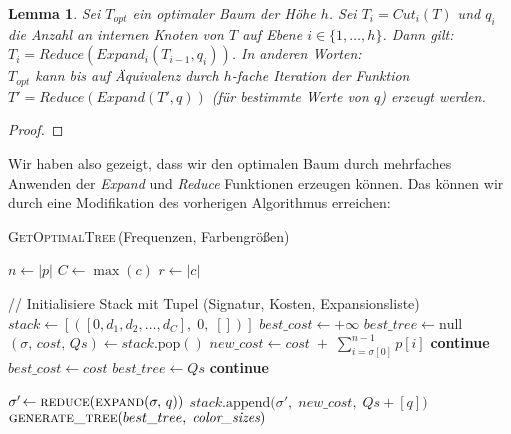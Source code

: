 \documentclass[a4paper,10pt,ngerman]{scrartcl}
\newtheorem{lemma}[satz]{Lemma}
\begin{document}
    \begin{lemma}
        Sei $T_{opt}$ ein optimaler Baum der Höhe $h$.
        Sei $T_i = Cut_i(T)$ und $q_i$ die Anzahl an internen Knoten von $T$ auf Ebene $i \in \{1, \dots, h\}$.
        Dann gilt: $T_i = Reduce(Expand_i(T_{i-1}, q_i))$.
        In anderen Worten: \\
        $T_{opt}$ kann bis auf Äquivalenz durch $h$-fache Iteration der Funktion $T' = Reduce(Expand(T',q))$ (für bestimmte Werte von $q$) erzeugt werden.
    \end{lemma}
    \begin{proof}

    \end{proof}
    Wir haben also gezeigt, dass wir den optimalen Baum durch mehrfaches Anwenden der \textit{Expand} und \textit{Reduce} Funktionen erzeugen können.
    Das können wir durch eine Modifikation des vorherigen Algorithmus erreichen:
    \begin{algorithm} [H]
        \caption{\textsc{GetOptimalTree}\,(Frequenzen, Farbengrößen)}
        \begin{algorithmic}[1]
                \State $n \gets |p|$  
                \State $C \gets \max(c)$ 
                \State $r \gets |c|$  

                \State // Initialisiere Stack mit Tupel (Signatur, Kosten, Expansionsliste)
                \State $stack \gets [([0, d_1, d_2, \dots, d_C],\;0,\;[])]$
                \State $best\_cost \gets +\infty$
                \State $best\_tree \gets \text{null}$
                    \State $(\sigma,\,cost,\,Qs) \gets stack.\mathrm{pop}()$
                    \State $new\_cost \gets cost \;+\;\sum_{i=\sigma[0]}^{n-1} p[i]$
                        \State \textbf{continue}
                    \EndIf
                            \State $best\_cost \gets cost$
                            \State $best\_tree \gets Qs$
                        \EndIf
                        \State \textbf{continue}
                    \EndIf

                        \State $\sigma'\!\gets \textsc{reduce}(\textsc{expand}(\sigma,\,q))$
                        \State $stack.\mathrm{append}\bigl(\sigma',\;new\_cost,\;Qs + [q]\bigr)$
                    \EndFor
                \EndWhile
                \State \Return $\textsc{generate\_tree}(best\_tree,\;\textit{color\_sizes})$
            \EndFunction
        \end{algorithmic}\label{alg:algorithm}
    \end{algorithm}
\end{document}
